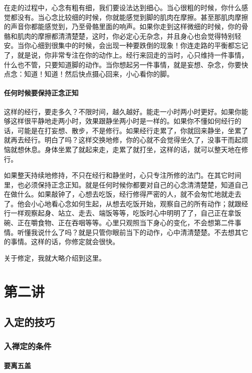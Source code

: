 \documentclass{book}
\begin{document}
在走的过程中，心念有粗有细，我们要设法达到细心。当心很粗的时候，你什么感觉都没有。当心念比较细的时候，你就能感觉到脚的肌肉在摩擦。甚至那肌肉摩擦的声音你都能感觉到，乃至骨骼里面的响声。如果你走到这样微细的时候，你的骨骼和肌肉的摩擦都清清楚楚，这时，你必定心无杂念，并且身心也会觉得特别轻安。当你心细到很集中的时候，会出现一种要跌倒的现象！你连走路的平衡都忘记了，就是说，你非常专注在你的动作上。经行来回走的当时，心只维持一件事情，什么也不管，只要知道脚的动作。当你想起另一件事情，就是妄想、杂念，你要快点念：知道！知道！然后快点摄心回来，小心看你的脚。

\subsubsection{任何时候要保持正念正知}

这样的经行，要走多久？不限时间，越久越好。能走一小时两小时更好。如果你能够这样很平静地走两小时，效果跟静坐两小时是一样的。如果你不懂如何经行的话，可能是在打妄想、散步，不是修行。如果经行走累了，你就回来静坐，坐累了就再去经行。明白了吗？这样交换地修，你的心就不会觉得坐久了，没事干而起烦恼就想休息。身体坐累了就起来走，走累了就打坐，这样的话，就可以整天地在修行。

如果整天持续地修持，不只在经行和静坐时，心只专注所修的法门。在其它时间里，也必须保持正念正知。就是任何时候你都要对自己的心念清清楚楚，知道自己在做什么。如果敲钟了，心想去吃饭，经行修得严密的人，就不会匆忙地就走去了。他会小心地看心念如何生起，从想去吃饭开始，观察自己的所有动作；就跟经行一样观察起身、站立、走去、端饭等等，吃饭时心中明明了了，自己正在拿饭碗、正在嚼食物、正在吞咽等等。心里只观照当下身心的变化，不会想第二件事情。听懂我说什么了吗？就是只管你眼前当下的动作，心中清清楚楚。不去想其它的事情。这样的话，你修定就会很快。

关于修定，我就大略介绍到这里。

\chapter{第二讲}

\section{入定的技巧}

\subsection{入禅定的条件}

\subsubsection{要离五盖}
\end{document}
